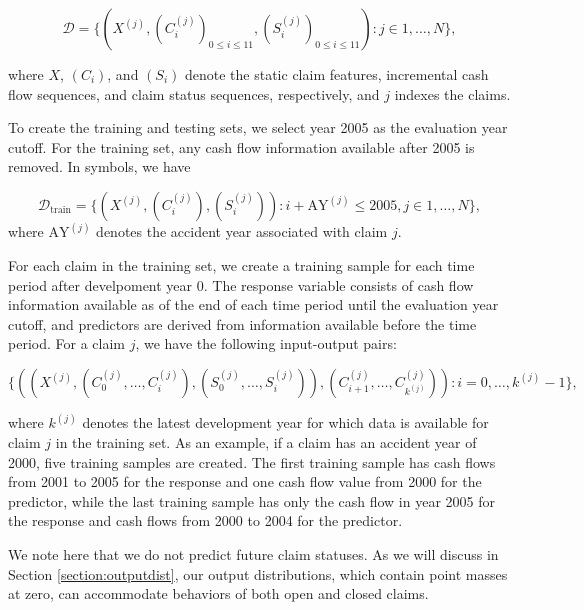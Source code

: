 \documentclass{article}
\begin{document}
\begin{equation}
    \mathcal{D} = \{ (X^{(j)}, (C_i^{(j)})_{0 \leq i \leq 11}, (S_i^{(j)})_{0 \leq i \leq 11}): j\in {1,\dots, N}\},
\end{equation}

where $X$, $(C_i)$, and $(S_i)$ denote the static claim features, incremental cash flow sequences, and claim status sequences, respectively, and $j$ indexes the claims.

To create the training and testing sets, we select year 2005 as the evaluation year cutoff. For the training set, any cash flow information available after  2005 is removed. In symbols, we have

\begin{equation}
    \mathcal{D}_{\text{train}} = \{ (X^{(j)}, (C_i^{(j)}), (S_i^{(j)})): i + \text{AY}^{(j)} \leq 2005, j \in {1,\dots, N}\},
\end{equation}
where $\text{AY}^{(j)}$ denotes the accident year associated with claim $j$.

For each claim in the training set, we create a training sample for each time period after develpoment year 0. The response variable consists of cash flow information available as of the end of each time period until the evaluation year cutoff, and predictors are derived from information available before the time period. For a claim $j$, we have the following input-output pairs:

\begin{equation}\label{eq:training-samples}
    \{((X^{(j)}, (C_0^{(j)}, \dots, C_i^{(j)}), (S_0^{(j)}, \dots, S_i^{(j)})), (C_{i+1}^{(j)}, \dots, C_{k^{(j)}}^{(j)})): i = 0, \dots, k^{(j)} - 1\},
\end{equation}

where $k^{(j)}$ denotes the latest development year for which data is available for claim $j$ in the training set. As an example, if a claim has an accident year of 2000, five training samples are created. The first training sample has cash flows from 2001 to 2005 for the response and one cash flow value from 2000 for the predictor, while the last training sample has only the cash flow in year 2005 for the response and cash flows from 2000 to 2004 for the predictor.

We note here that we do not predict future claim statuses. As we will discuss in Section \ref{section:outputdist}, our output distributions, which contain point masses at zero, can accommodate behaviors of both open and closed claims.
\end{document}
